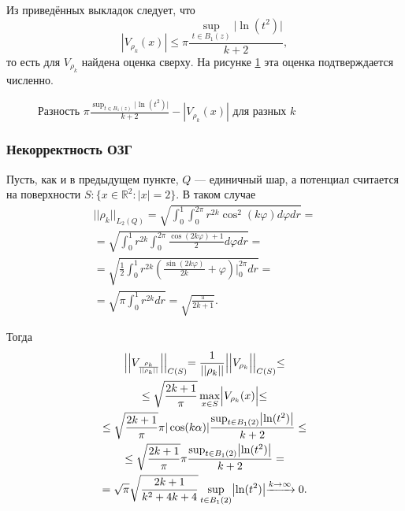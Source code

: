 \documentclass[a4paper]{article}
\newcommand{\R}[1]{\mathbb{R}^#1}
\begin{document}
Из приведённых выкладок следует, что
\begin{equation}
  | V_{\rho_k}(x)| \leq \pi \frac{\sup_{t \in B_1(z)} \bigl| \ln (t^2) \bigl|}{k+2},
\end{equation}
то есть для $V_{\rho_k}$ найдена оценка сверху. На рисунке \ref{chis} эта оценка подтверждается численно.
\begin{figure}[h!]
  \noindent{}
  \caption{Разность $\pi \frac{\sup_{t \in B_1(z)} \bigl| \ln (t^2) \bigl|}{k+2} -| V_{\rho_k}(x)| $ для разных $k$}
  \label{chis}
\end{figure}

\subsubsection{Некорректность ОЗГ}
Пусть, как и в предыдущем пункте, $Q$ --- единичный шар, а потенциал считается на поверхности $S: \{x\in \R{2}: |x|=2 \}$. В таком случае
\begin{multline}
  ||\rho_k ||_{L_2(Q)}=\sqrt{\int_0^1 \int_0^{2 \pi} r^{2k} \cos^2(k \varphi) d\varphi dr}= \\
  = \sqrt{\int_0^1 r^{2k} \int_0^{2 \pi} \frac{\cos(2k \varphi)+1}{2}  d\varphi dr}=\\
  =\sqrt{\frac{1}{2} \int_0^1 r^{2k} \left( \frac{\sin(2k \varphi)}{2k} +\varphi\right)\Biggl|_0^{2 \pi} dr}= \\
  =\sqrt{\pi \int_0^1 r^{2k} dr}=\sqrt{\frac{\pi}{2k+1}}.
\end{multline}

Тогда
\begin{multline}
  \Bigl|\Bigl|V_{\frac{\rho_k}{||\rho_k ||}}\Bigl|\Bigl|_{C(S)}= \frac{1}{||\rho_k ||} \Bigl|\Bigl|V_{\rho_k}  \Bigl|\Bigl|_{C(S)} \leq\\
  \leq \sqrt{\frac{2k+1}{\pi}} \max_{x \in S} \Bigl| V_{\rho_k}(x) \Bigl|\leq\\
  \leq \sqrt{\frac{2k+1}{\pi}} \pi |\cos(k\alpha)| \frac{\sup_{t \in B_1(2)} \bigl| \ln (t^2) \bigl|}{k+2} \leq\\
  \leq \sqrt{\frac{2k+1}{\pi}} \pi \frac{\sup_{ t \in B_1(2)} \bigl| \ln (t^2) \bigl|}{k+2} = \\
  =\sqrt{\pi} \sqrt{\frac{2k+1}{k^2 + 4k+4}}\sup_{t \in B_1(2)} \bigl| \ln (t^2) \bigl| \xrightarrow{k \rightarrow \infty} 0.
\end{multline}
\end{document}
